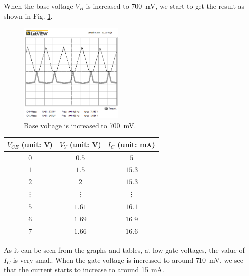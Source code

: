 \documentclass[journal]{IEEEtran}
\begin{document}
\subsubsection{}
\par When the base voltage $V_{B}$ is increased to \SI{700}{\mV}, we start to get the result
as shown in Fig. \ref{fig-3-3}.
\begin{figure}[h]
  \centering
  \includegraphics[width=0.45\textwidth]{images/3-3.png}
  \caption{Base voltage is increased to \SI{700}{\mV}.}
  \label{fig-3-3}
\end{figure}
\begin{center}
    \begin{tabular}{ |c|c|c| }
        \hline
        $V_{CE}$ (unit: \si{\volt}) & $V_{Y}$ (unit: \si{\volt})&  $I_{C}$ (unit: \si{\mA})\\
        \hline
        $0$ & $0.5$ & $5$ \\
        \hline
        $1$ & $1.5$ & $15.3$ \\
        \hline
        $2$ & $2$ & $15.3$ \\
        \hline
        \vdots & \vdots & \vdots \\
        \hline
        $5$ & $1.61$ & $16.1$ \\
        \hline
        $6$ & $1.69$ & $16.9$ \\
        \hline
        $7$ & $1.66$ & $16.6$ \\
        \hline
    \end{tabular}
\end{center}
\par As it can be seen from the graphs and tables, at low gate voltages, the value of $I_{C}$ is very small.
When the gate voltage is increased to around \SI{710}{\mV}, we see that the current starts to increase to around \SI{15}{\mA}.
\end{document}
